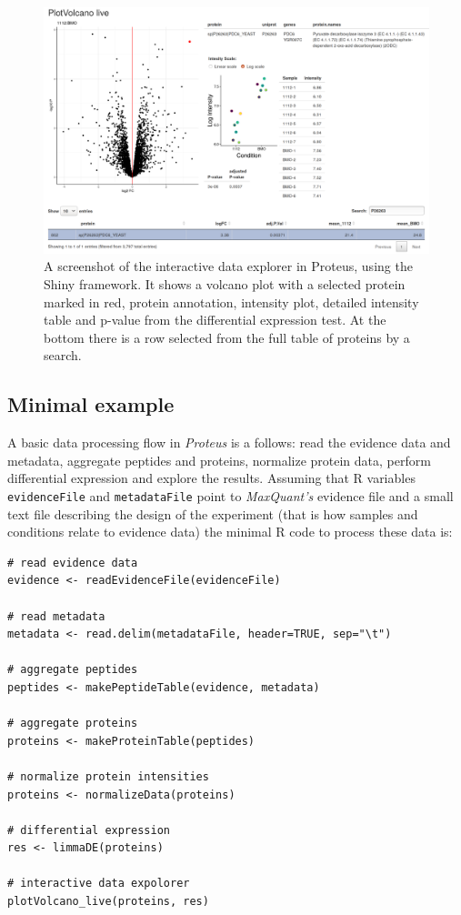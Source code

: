 \documentclass[]{article}
\begin{document}
\begin{figure}[H]

{\centering \includegraphics{../volcano_live_screenshot} 

}

\caption{\label{fig:shiny}A screenshot of the interactive data explorer in Proteus, using the Shiny framework. It shows a volcano plot with a selected protein marked in red, protein annotation, intensity plot, detailed intensity table and p-value from the differential expression test. At the bottom there is a row selected from the full table of proteins by a search.}\label{fig:fig_shiny}
\end{figure}

\subsection{Minimal example}\label{minimal-example}

A basic data processing flow in \emph{Proteus} is a follows: read the
evidence data and metadata, aggregate peptides and proteins, normalize
protein data, perform differential expression and explore the results.
Assuming that R variables \texttt{evidenceFile} and
\texttt{metadataFile} point to \emph{MaxQuant's} evidence file and a
small text file describing the design of the experiment (that is how
samples and conditions relate to evidence data) the minimal R code to
process these data is:

\begin{verbatim}
# read evidence data
evidence <- readEvidenceFile(evidenceFile)

# read metadata
metadata <- read.delim(metadataFile, header=TRUE, sep="\t")

# aggregate peptides
peptides <- makePeptideTable(evidence, metadata)

# aggregate proteins
proteins <- makeProteinTable(peptides)

# normalize protein intensities
proteins <- normalizeData(proteins)

# differential expression
res <- limmaDE(proteins)

# interactive data expolorer
plotVolcano_live(proteins, res)
\end{verbatim}
\end{document}
